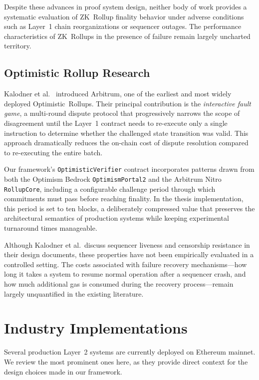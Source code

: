 \documentclass[
]{elteikthesis}[2024/04/26]
\begin{document}
Despite these advances in proof system design, neither body of work provides a systematic evaluation of ZK~Rollup finality behavior under adverse conditions such as Layer~1 chain reorganizations or sequencer outages. The performance characteristics of ZK~Rollups in the presence of failure remain largely uncharted territory.

\subsection{Optimistic Rollup Research}

Kalodner et al.~\cite{arbitrum-original} introduced Arbitrum, one of the earliest and most widely deployed Optimistic~Rollups. Their principal contribution is the \textit{interactive fault game}, a multi-round dispute protocol that progressively narrows the scope of disagreement until the Layer~1 contract needs to re-execute only a single instruction to determine whether the challenged state transition was valid. This approach dramatically reduces the on-chain cost of dispute resolution compared to re-executing the entire batch.

Our framework's \texttt{OptimisticVerifier} contract incorporates patterns drawn from both the Optimism Bedrock \texttt{OptimismPortal2} and the Arbitrum Nitro \texttt{RollupCore}, including a configurable challenge period through which commitments must pass before reaching finality. In the thesis implementation, this period is set to ten blocks, a deliberately compressed value that preserves the architectural semantics of production systems while keeping experimental turnaround times manageable.

Although Kalodner et al.\ discuss sequencer liveness and censorship resistance in their design documents, these properties have not been empirically evaluated in a controlled setting. The costs associated with failure recovery mechanisms---how long it takes a system to resume normal operation after a sequencer crash, and how much additional gas is consumed during the recovery process---remain largely unquantified in the existing literature.

\section{Industry Implementations}

Several production Layer~2 systems are currently deployed on Ethereum mainnet. We review the most prominent ones here, as they provide direct context for the design choices made in our framework.
\end{document}
